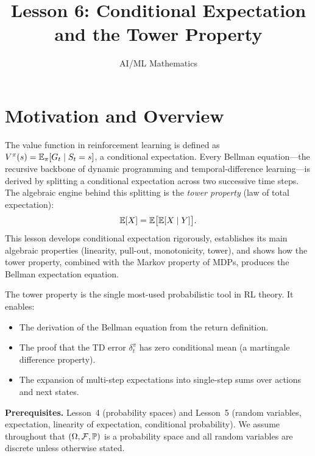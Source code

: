 \documentclass[11pt,a4paper]{article}
\title{Lesson 6: Conditional Expectation and the Tower Property}
\author{AI/ML Mathematics}
\date{}
\begin{document}
\maketitle
\tableofcontents
\newpage


\section{Motivation and Overview}
\label{sec:motivation}

The value function in reinforcement learning is defined as
$V^\pi(s) = \mathbb{E}_\pi[G_t \mid S_t = s]$, a conditional expectation.
Every Bellman equation---the recursive backbone of dynamic
programming and temporal-difference learning---is derived by
splitting a conditional expectation across two successive time
steps.  The algebraic engine behind this splitting is the
\emph{tower property} (law of total expectation):
\[
  \mathbb{E}[X] = \mathbb{E}\bigl[\mathbb{E}[X \mid Y]\bigr].
\]
This lesson develops conditional expectation rigorously,
establishes its main algebraic properties (linearity, pull-out,
monotonicity, tower), and shows how the tower property,
combined with the Markov property of MDPs, produces the Bellman
expectation equation.

\begin{rlconnection}[title={Why This Matters for RL}]
The tower property is the single most-used probabilistic tool in
RL theory.  It enables:
\begin{itemize}[nosep]
  \item The derivation of the Bellman equation from the return
    definition.
  \item The proof that the TD error $\delta_t^\pi$ has zero
    conditional mean (a martingale difference property).
  \item The expansion of multi-step expectations into single-step
    sums over actions and next states.
\end{itemize}
\end{rlconnection}

\medskip
\noindent\textbf{Prerequisites.}
Lesson~4 (probability spaces) and Lesson~5 (random variables,
expectation, linearity of expectation, conditional probability).
We assume throughout that $(\Omega, \mathcal{F}, \mathbb{P})$ is a
probability space and all random variables are discrete unless
otherwise stated.
\end{document}
